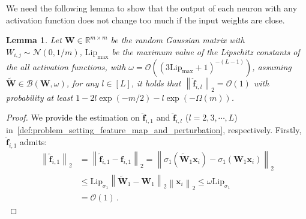 \documentclass[nohyperref]{article}
\theoremstyle{plain}
\newtheorem{lemma}{Lemma}
\theoremstyle{definition}
\theoremstyle{remark}
\begin{document}
We need the following lemma to show that the output of each neuron with any activation function does not change too much if the input weights are close.
\begin{lemma}
\label{lemma:bound_for_perturbation}
Let $\bm{W} \in \mathbb{R} ^{m \times m}$ be the random Gaussian matrix with ${W}_{i,j} \sim \mathcal{N} (0, 1/m)$, $\mathrm{Lip}_{\max}$ be the maximum value of the Lipschitz constants of the all activation functions, with $\omega = \mathcal{O}((3\mathrm{Lip}_{\max}+1)^{-(L-1)})$, assuming $\widetilde{\bm{W}} \in \mathcal{B} (\bm{W},\omega )$, for any $l \in[L]$, it holds that $\left \| \hat{\bm{f}}_{i,l} \right \| _2 = \mathcal{O}(1)$ with probability at least $1-2l\exp(-m/2)-l\exp(-\Omega (m))$.
\end{lemma}
\begin{proof}
\label{proof:bound_for_perturbation_ResNet}
We provide the estimation on $ \hat{\bm{f}}_{i,1}$ and $ \hat{\bm{f}}_{i,l}$ ($l=2,3,\cdots,L$) in~\cref{def:problem_setting_feature_map_and_perturbation}, respectively. 
Firstly, $ \hat{\bm{f}}_{i,1}$ admits:
\begin{equation*}
\begin{split}
\left \| \hat{\bm{f}}_{i,1} \right \| _2 & = \left \| \widetilde{\bm{f}}_{i,1} - \bm{f}_{i,1} \right \| _2 = \left \| \sigma_1(\widetilde{\bm{W}}_1\bm{x}_i) - \sigma_1(\bm{W}_1\bm{x}_i) \right \| _2\\
& \leq \mathrm{Lip}_{\sigma_{1}}\left \| \widetilde{\bm{W}}_1 - \bm{W}_1 \right \| _2 \left \|\bm{x}_i \right \| _2 \leq \omega \mathrm{Lip}_{\sigma_{1}}\\ 
& = \mathcal{O}(1)\,.
\end{split}
\end{equation*}


\end{proof}
\end{document}
